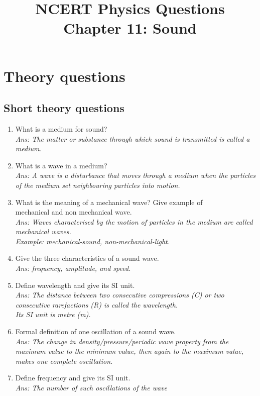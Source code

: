\documentclass[12pt]{article}
\title{NCERT Physics Questions \\ Chapter 11: Sound}
\author{}
\date{}
\begin{document}
\maketitle

\section*{Theory questions}
\subsection*{Short theory questions}
\begin{enumerate}
	\item What is a medium for sound? \\
		\textit{Ans: The matter or substance through which sound
			is transmitted is called a medium.}
	\item What is a wave in a medium? \\
		\textit{Ans: A wave is a disturbance that moves
			through a medium when the particles of the
			medium set neighbouring particles into motion.}
	\item What is the meaning of a mechanical wave? Give example of \\ mechanical and non mechanical wave. \\
		\textit{Ans: Waves characterised by the
			motion of particles in the medium are
			called mechanical waves. \\
			Example: mechanical-sound, non-mechanical-light.}
	\item Give the three characteristics of a sound wave. \\
		\textit{Ans: frequency, amplitude, and speed.}
	\item Define wavelength and give its SI unit. \\
		\textit{Ans: The distance between two consecutive
			compressions (C) or two consecutive
			rarefactions (R) is called the wavelength. \\
			Its SI unit is metre (m).}
	\item Formal definition of one oscillation of a sound wave. \\
		\textit{Ans: The change in density/pressure/periodic wave property
			from the maximum value to the minimum value, then again to the
			maximum value, makes one complete oscillation.}
	\item Define frequency and give its SI unit. \\
		\textit{Ans: The number of such oscillations of the wave
}
\end{enumerate}
\end{document}
